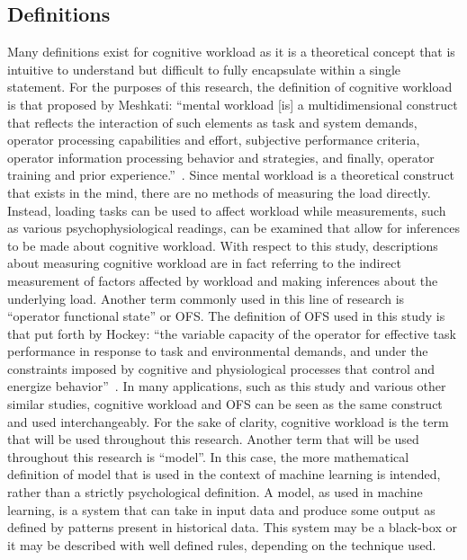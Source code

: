 \documentclass[11pt]{article}
\begin{document}
\subsection{Definitions}
Many definitions exist for cognitive workload as it is a theoretical concept that is intuitive to understand but difficult to fully encapsulate within a single statement. For the purposes of this research, the definition of cognitive workload is that proposed by Meshkati: ``mental workload [is] a multidimensional construct that reflects the interaction of such elements as task and system demands, operator processing capabilities and effort, subjective performance criteria, operator information processing behavior and strategies, and finally, operator training and prior experience.''~\cite{Meshkati}. Since mental workload is a theoretical construct that exists in the mind, there are no methods of measuring the load directly. Instead, loading tasks can be used to affect workload while measurements, such as various psychophysiological readings, can be examined that allow for inferences to be made about cognitive workload. With respect to this study, descriptions about measuring cognitive workload are in fact referring to the indirect measurement of factors affected by workload and making inferences about the underlying load. Another term commonly used in this line of research is ``operator functional state'' or OFS. The definition of OFS used in this study is that put forth by Hockey: ``the variable capacity of the operator for effective task performance in response to task and environmental demands, and under the constraints imposed by cognitive and physiological processes that control and energize behavior''~\cite{Hockey}. In many applications, such as this study and various other similar studies, cognitive workload and OFS can be seen as the same construct and used interchangeably. For the sake of clarity, cognitive workload is the term that will be used throughout this research. Another term that will be used throughout this research is ``model''. In this case, the more mathematical definition of model that is used in the context of machine learning is intended, rather than a strictly psychological definition. A model, as used in machine learning, is a system that can take in input data and produce some output as defined by patterns present in historical data. This system may be a black-box or it may be described with well defined rules, depending on the technique used.
\end{document}

